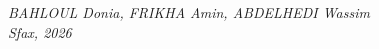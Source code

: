 \documentclass[12pt,a4paper]{report}
\begin{document}
\vspace{1cm}
\begin{flushright}
\textit{BAHLOUL Donia, FRIKHA Amin, ABDELHEDI Wassim}\\
\textit{Sfax, 2026}
\end{flushright}

\newpage

\printbibliography[heading=bibintoc, title={Bibliographie}]
\end{document}
